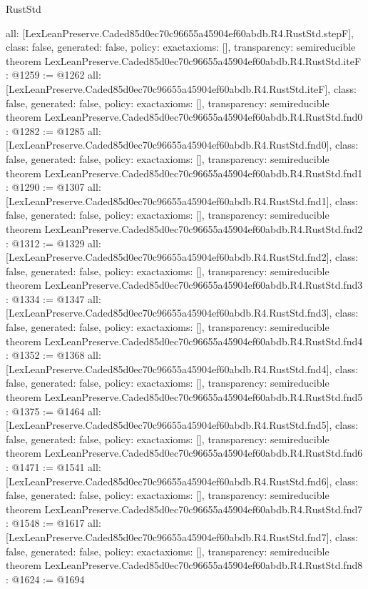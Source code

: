 \begin{lexlean}{RustStd}
\begin{coremodule}
{  all: [LexLeanPreserve.Caded85d0ec70c96655a45904ef60abdb.R4.RustStd.stepF],
  class: false,
  generated: false,
  policy: exact{axioms: []},
  transparency: semireducible
}
theorem LexLeanPreserve.Caded85d0ec70c96655a45904ef60abdb.R4.RustStd.iteF : @1259 := @1262 {
  all: [LexLeanPreserve.Caded85d0ec70c96655a45904ef60abdb.R4.RustStd.iteF],
  class: false,
  generated: false,
  policy: exact{axioms: []},
  transparency: semireducible
}
theorem LexLeanPreserve.Caded85d0ec70c96655a45904ef60abdb.R4.RustStd.fnd0 : @1282 := @1285 {
  all: [LexLeanPreserve.Caded85d0ec70c96655a45904ef60abdb.R4.RustStd.fnd0],
  class: false,
  generated: false,
  policy: exact{axioms: []},
  transparency: semireducible
}
theorem LexLeanPreserve.Caded85d0ec70c96655a45904ef60abdb.R4.RustStd.fnd1 : @1290 := @1307 {
  all: [LexLeanPreserve.Caded85d0ec70c96655a45904ef60abdb.R4.RustStd.fnd1],
  class: false,
  generated: false,
  policy: exact{axioms: []},
  transparency: semireducible
}
theorem LexLeanPreserve.Caded85d0ec70c96655a45904ef60abdb.R4.RustStd.fnd2 : @1312 := @1329 {
  all: [LexLeanPreserve.Caded85d0ec70c96655a45904ef60abdb.R4.RustStd.fnd2],
  class: false,
  generated: false,
  policy: exact{axioms: []},
  transparency: semireducible
}
theorem LexLeanPreserve.Caded85d0ec70c96655a45904ef60abdb.R4.RustStd.fnd3 : @1334 := @1347 {
  all: [LexLeanPreserve.Caded85d0ec70c96655a45904ef60abdb.R4.RustStd.fnd3],
  class: false,
  generated: false,
  policy: exact{axioms: []},
  transparency: semireducible
}
theorem LexLeanPreserve.Caded85d0ec70c96655a45904ef60abdb.R4.RustStd.fnd4 : @1352 := @1368 {
  all: [LexLeanPreserve.Caded85d0ec70c96655a45904ef60abdb.R4.RustStd.fnd4],
  class: false,
  generated: false,
  policy: exact{axioms: []},
  transparency: semireducible
}
theorem LexLeanPreserve.Caded85d0ec70c96655a45904ef60abdb.R4.RustStd.fnd5 : @1375 := @1464 {
  all: [LexLeanPreserve.Caded85d0ec70c96655a45904ef60abdb.R4.RustStd.fnd5],
  class: false,
  generated: false,
  policy: exact{axioms: []},
  transparency: semireducible
}
theorem LexLeanPreserve.Caded85d0ec70c96655a45904ef60abdb.R4.RustStd.fnd6 : @1471 := @1541 {
  all: [LexLeanPreserve.Caded85d0ec70c96655a45904ef60abdb.R4.RustStd.fnd6],
  class: false,
  generated: false,
  policy: exact{axioms: []},
  transparency: semireducible
}
theorem LexLeanPreserve.Caded85d0ec70c96655a45904ef60abdb.R4.RustStd.fnd7 : @1548 := @1617 {
  all: [LexLeanPreserve.Caded85d0ec70c96655a45904ef60abdb.R4.RustStd.fnd7],
  class: false,
  generated: false,
  policy: exact{axioms: []},
  transparency: semireducible
}
theorem LexLeanPreserve.Caded85d0ec70c96655a45904ef60abdb.R4.RustStd.fnd8 : @1624 := @1694 {
}
\end{coremodule}
\end{lexlean}

